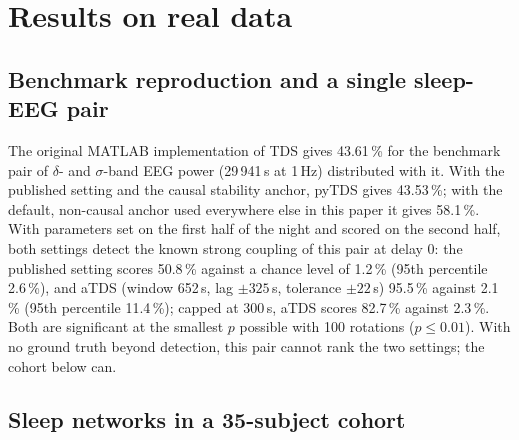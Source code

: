 \documentclass[11pt,a4paper]{article}
\begin{document}

\section{Results on real data}
\label{sec:realdata}
\subsection{Benchmark reproduction and a single sleep-EEG pair}
\label{sec:res-benchmark}
The original MATLAB implementation of TDS gives 43.61\,\% for the benchmark pair of $\delta$- and $\sigma$-band EEG power (29\,941\,s at 1\,Hz) distributed with it. With the published setting and the causal stability anchor, pyTDS gives 43.53\,\%; with the default, non-causal anchor used everywhere else in this paper it gives 58.1\,\%. With parameters set on the first half of the night and scored on the second half, both settings detect the known strong coupling of this pair at delay 0: the published setting scores 50.8\,\% against a chance level of 1.2\,\% (95th percentile 2.6\,\%), and aTDS (window 652\,s, lag $\pm325$\,s, tolerance $\pm22$\,s) 95.5\,\% against 2.1\,\% (95th percentile 11.4\,\%); capped at 300\,s, aTDS scores 82.7\,\% against 2.3\,\%. Both are significant at the smallest $p$ possible with 100 rotations ($p \le 0.01$). With no ground truth beyond detection, this pair cannot rank the two settings; the cohort below can.

\subsection{Sleep networks in a 35-subject cohort}
\label{sec:res-cohort}
\end{document}
